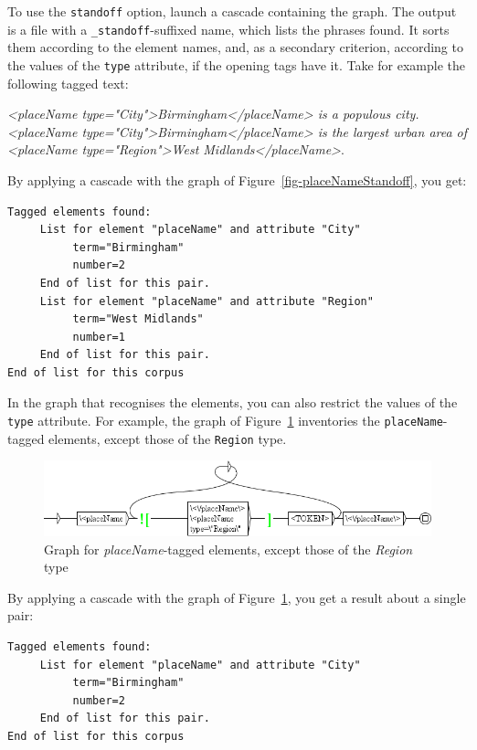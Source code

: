 \bigskip
\noindent To use the \verb$standoff$ option, launch a cascade containing the graph. The output is a file
with a \verb$_standoff$-suffixed name,
which lists the phrases found. It sorts them according to the element names,
and, as a secondary criterion, according to the values of the \verb$type$ attribute, if the opening tags have
it. Take for example the following tagged text:

\bigskip
\noindent \emph{<placeName type="City">Birmingham</placeName> is a populous city. \\
<placeName type="City">Birmingham</placeName> is the largest urban area of \\
<placeName type="Region">West Midlands</placeName>}.

\bigskip
\noindent By applying a cascade with the graph of Figure~\ref{fig-placeNameStandoff},
you get:
\begin{verbatim}
Tagged elements found:
     List for element "placeName" and attribute "City" 
          term="Birmingham" 
          number=2 
     End of list for this pair.
     List for element "placeName" and attribute "Region" 
          term="West Midlands" 
          number=1 
     End of list for this pair.
End of list for this corpus
\end{verbatim}

\noindent In the graph that recognises the elements, you can also restrict the values of the
\verb$type$ attribute. For example, the graph of Figure~\ref{fig-placeNameHorsRegionStandoff}
inventories the \verb$placeName$-tagged elements, except those of the \verb$Region$ type.

\begin{figure}[!htb]
  \centering
  \includegraphics[width=15cm]{resources/img/placeNameHorsRegionStandoff.png}
  \caption{Graph for \emph{placeName}-tagged elements, except those of the \emph{Region} type}
  \label{fig-placeNameHorsRegionStandoff}
\end{figure}

\noindent By applying a cascade with the graph of Figure~\ref{fig-placeNameHorsRegionStandoff},
you get a result about a single pair:
\begin{verbatim}
Tagged elements found:
     List for element "placeName" and attribute "City" 
          term="Birmingham" 
          number=2 
     End of list for this pair.
End of list for this corpus
\end{verbatim}

